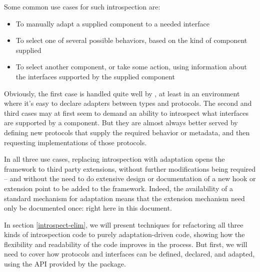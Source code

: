 \begin{verbatim%
}
\begin{verbatim%
}
Some common use cases for such introspection are:

\begin{itemize}

\item To manually adapt a supplied component to a needed interface

\item To select one of several possible behaviors, based on the kind of
component supplied

\item To select another component, or take some action, using information
about the interfaces supported by the supplied component

\end{itemize}

Obviously, the first case is handled quite well by , at
least in an environment where it's easy to declare adapters between types and
protocols.  The second and third cases may at first seem to demand an ability
to introspect what interfaces are supported by a component.  But they are almost
always better served by defining new protocols that supply the required behavior
or metadata, and then requesting implementations of those protocols.





In all three use cases, replacing introspection with adaptation opens the
framework to third party extensions, without further modifications being
required -- and without the need to do extensive design or documentation
of a new hook or extension point to be added to the framework.  Indeed,
the availability of a standard mechanism for adaptation means that the
extension mechanism need only be documented once: right here in this
document.

In section \ref{introspect-elim}, we will present techniques for refactoring
all three kinds of introspection code to purely adaptation-driven
code, showing how the flexibility and readability of the code improves in the
process.  But first, we will need to cover how protocols and interfaces can
be defined, declared, and adapted, using the API provided by the
 package.

\begin{seealso}



\end{seealso}
\end{verbatim%
}
\end{verbatim%
}
